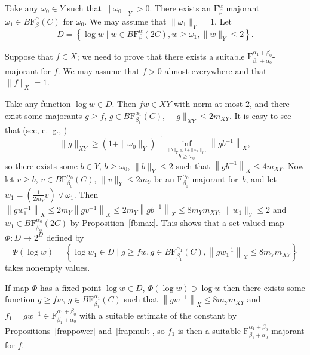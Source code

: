 \documentclass[12pt]{amsart}
\newcommand {\frclass} [2] {\ensuremath{\mathrm F^{#1}_{#2}}}
\newcommand {\weightv} {\ensuremath {\mathit v}}
\newcommand {\weightw} {\ensuremath {\mathit w}}
\newcommand {\fbab} [3] {\ensuremath {B\frclass {#1} {#2} \left(#3\right)}}
\begin{document}
Take any $\omega_0 \in Y$ such that $\|\omega_0\|_Y > 0$.  There exists an $\frclass {\alpha} {\beta}$ majorant
$\omega_1 \in \fbab {\alpha} {\beta} {C}$ for $\omega_0$.
We may assume that $\|\omega_1\|_Y = 1$.  Let
$$
D = \left\{\log \weightw \mid \weightw \in \fbab {\alpha} {\beta} {2 C},
\weightw \geqslant \omega_1, \|\weightw\|_Y \leqslant 2\right\}.
$$

Suppose that $f \in X$; we need to prove that there exists a suitable
$\frclass {\alpha_1 + \beta_0} {\beta_1 + \alpha_0}$-majorant for $f$.  We may assume that $f > 0$ almost everywhere
and that $\|f\|_X = 1$.

Take any function $\log \weightw \in D$.  Then $f \weightw \in X Y$ with norm at most $2$, and
there exist some majorants $g \geqslant f$, $g \in \fbab {\alpha_1} {\beta_1} {C}$,
$\|g\|_{X Y} \leqslant 2 m_{X Y}$.
It is easy to see that (see, e.~g., \cite [(16)] {rutsky2011en})
$$
\|g\|_{X Y} \geqslant \left(1 + \|\omega_0\|_Y\right)^{-1}
\inf_{\stackrel {\|b\|_Y \leqslant 1 + \|\omega_0\|_Y,}{b \geqslant \omega_0}} \left\|g b^{-1}\right\|_X,
$$
so there exists some $b \in Y$, $b \geqslant \omega_0$, $\|b\|_Y \leqslant 2$ such that
$\left\|g b^{-1}\right\|_X \leqslant 4 m_{X Y}$.  Now let $\weightv \geqslant b$,
$\weightv \in \fbab {\alpha_0} {\beta_0} {C}$, $\|\weightv\|_Y \leqslant 2 m_{Y}$ be
an $\frclass {\alpha_0} {\beta_0}$-majorant for~$b$, and let
$\weightw_1 = \left(\frac 1 {2 m_{Y}} \weightv\right) \vee \omega_1$.
Then $\left\|g \weightw_1^{-1}\right\|_X \leqslant
2 m_{Y} \left\|g \weightv^{-1}\right\|_X \leqslant 2 m_{Y} \left\|g b^{-1}\right\|_X \leqslant 8 m_{Y} m_{X Y}$,
$\|\weightw_1\|_{Y} \leqslant 2$ and
$\weightw_1 \in \fbab {\alpha_0} {\beta_0} {2 C}$ by Proposition~\ref {fbmax}.
This shows that a set-valued map $\Phi : D \to 2^D$
defined by
$$
\Phi (\log \weightw) = \left\{ \log \weightw_1 \in D \mid g \geqslant f \weightw, g \in \fbab {\alpha_1} {\beta_1} {C},
\left\|g \weightw_1^{-1}\right\|_X \leqslant 8 m_{Y} m_{X Y}\right\}
$$
takes nonempty values.

If map $\Phi$ has a fixed point $\log \weightw \in D$, $\Phi (\log \weightw) \ni \log \weightw$ then
there exists some function $g \geqslant f \weightw$, $g \in \fbab {\alpha_1} {\beta_1} {C}$ such that
$\left\|g \weightw^{-1}\right\|_X \leqslant 8 m_{Y} m_{X Y}$
and $f_1 = g \weightw^{-1} \in \frclass {\alpha_1 + \beta_0} {\beta_1 + \alpha_0}$ with a suitable estimate of the constant
by Propositions~\ref {frappower} and~\ref {frapmult}, so $f_1$ is then a suitable
$\frclass {\alpha_1 + \beta_0} {\beta_1 + \alpha_0}$-majorant for $f$.
\end{document}
